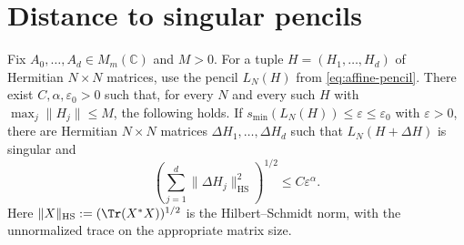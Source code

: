 \section{Distance to singular pencils}\label{sec:distance}

\begin{proposition}\label{prop:distance}
Fix $A_0,\ldots,A_d\in M_m(\mathbb C)$ and $M>0$.
For a tuple $H=(H_1,\ldots,H_d)$ of Hermitian $N\times N$ matrices, use the pencil $L_N(H)$ from \eqref{eq:affine-pencil}.
There exist $C,\alpha,\varepsilon_0>0$ such that, for every $N$ and every such $H$ with $\max_j\|H_j\|\le M$, the following holds.
If $s_{\min}(L_N(H))\le\varepsilon\le\varepsilon_0$ with $\varepsilon>0$, there are Hermitian $N\times N$ matrices $\Delta H_1,\ldots,\Delta H_d$ such that $L_N(H+\Delta H)$ is singular and
\begin{equation}\label{eq:perturbation-bound}
 \left(\sum_{j=1}^d\|\Delta H_j\|_{\mathrm{HS}}^2\right)^{1/2}
 \le C\varepsilon^\alpha.
\end{equation}
Here $\|X\|_{\mathrm{HS}}:=(\Tr(X^*X))^{1/2}$ is the Hilbert--Schmidt norm, with the unnormalized trace on the appropriate matrix size.
\end{proposition}

